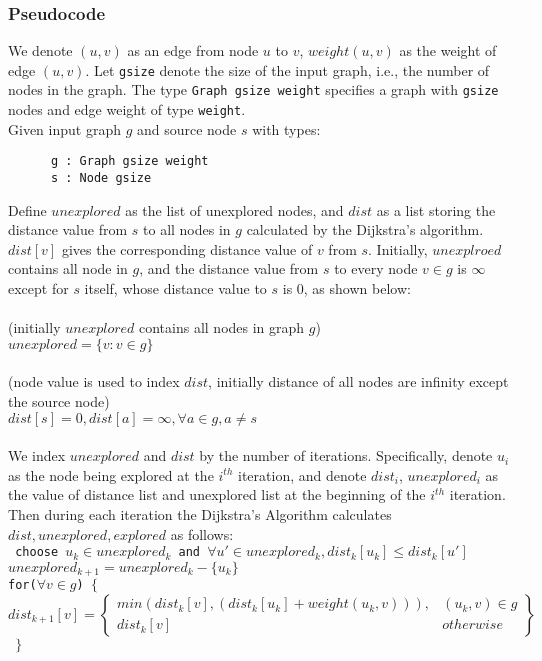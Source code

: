 
\subsubsection{Pseudocode}
We denote $(u, v)$ as an edge from node $u$ to $v$, $weight(u, v)$ as the weight of edge $(u, v)$. Let \texttt{gsize} denote the size of the input graph, i.e., the number of nodes in the graph. The type \texttt{Graph gsize weight} specifies a graph with \texttt{gsize} nodes and edge weight of type \texttt{weight}. 
\\
Given input graph $g$ and source node $s$ with types:
\begin{lstlisting}
      g : Graph gsize weight
      s : Node gsize
\end{lstlisting}

Define $unexplored$ as the list of unexplored nodes, and $dist$ as a list storing the distance value from $s$ to all nodes in $g$ calculated by the Dijkstra's algorithm. $dist[v]$ gives the corresponding distance value of $v$ from $s$. Initially, $unexplroed$ contains all node in $g$, and the distance value from $s$ to every node $v \in g$ is $\infty$ except for $s$ itself, whose distance value to $s$ is 0, as shown below:  
\\\\
\tab (initially $unexplored$ contains all nodes in graph $g$)\\
\tab $unexplored = \{v : v \in g\}$
\\\\
\tab (node value is used to index $dist$, initially distance of all nodes are infinity except 
\\ \tab the source node)\\
\tab $dist[s] = 0, dist[a] = \infty, \forall a \in g, a \neq s$
\\\\
We index $unexplored$ and $dist$ by the number of iterations. Specifically, denote $u_i$ as the node being explored at the $i^{th}$ iteration, and denote $dist_i$, $unexplored_i$ as the value of distance list and unexplored list at the beginning of the $i^{th}$ iteration. Then during each iteration the Dijkstra's Algorithm calculates $dist, unexplored, explored$ as follows:
\\
\texttt{
  \tab\tab choose $u_k \in unexplored_k$ and $\forall u' \in unexplored_k, dist_k[u_k] \leq dist_k[u']$ \\
  \tab\tab $unexplored_{k+1} = unexplored_k - \{u_k\}$                    \\
  \tab\tab for($\forall v \in g$) $\{$
  \tab\[
        dist_{k+1}[v] = \left.
        \begin{cases} 
          min(dist_k[v], (dist_k[u_k] + weight(u_k,v))), & (u_k,v) \in g \\ 
          dist_k[v] & otherwise 
        \end{cases}
        \right\}
      \]
  \tab\tab $\}$ \\
}
\\\\


